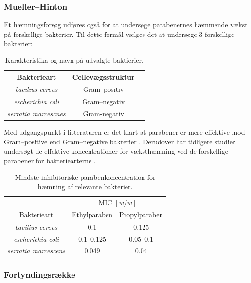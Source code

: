     \subsubsection{Mueller--Hinton}
    Et hæmningsforsøg udføres også for at undersøge parabenernes hæmmende vækst på forskellige bakterier. Til dette formål vælges det at undersøge 3 forskellige bakterier:
    \begin{table}[H]\centering
        \caption{Karakteristika og navn på udvalgte baktierier.}
        \begin{tabular}{ccc}
            \toprule
            Bakterieart & Cellevægsstruktur \\
            \midrule
            \textit{bacilius cereus} & Gram--positiv \\
            \textit{escherichia coli} & Gram--negativ \\
            \textit{serratia marcescnes} & Gram-negativ \\
            \bottomrule
        \end{tabular}
    \end{table}
    Med udgangspunkt i litteraturen er det klart at parabener er mere effektive mod Gram--positive end Gram--negative bakterier \parencite{Joao2021}. Derudover har tidligere studier undersøgt de effektive koncentrationer for væksthæmning ved de forskellige parabener for bakteriearterne \parencite{Wies2019}. 
    \begin{table}[H]\centering
        \caption{Mindste inhibitoriske parabenkoncentration for hæmning af relevante bakterier.}
        \begin{tabular}{ccc}
            \toprule
            & \multicolumn{2}{c}{MIC $\left[\si{w\per w}\right]$} \\
            \cmidrule(r){2-3}
            Bakterieart & Ethylparaben & Propylparaben \\
            \midrule
            \textit{bacilius cereus} &  0.1 & 0.125 \\
            \textit{escherichia coli} & 0.1--0.125 & 0.05--0.1 \\
            \textit{serratia marcescens} & 0.049 & 0.04 \\ 
            \bottomrule
        \end{tabular}
    \end{table}

    \subsubsection{Fortyndingsrække}
